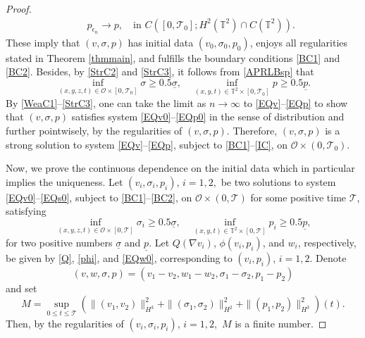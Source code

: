 \documentclass[12pt,reqno]{amsart}
\numberwithin{equation}{section}
\begin{document}
\begin{proof}
\begin{eqnarray}
    &&p_{\epsilon_n} \rightarrow p,\quad\mbox{in }C([0,\mathcal T_0]; H^2(\mathbb T^2)\cap C(\mathbb T^2)).\label{StrC3}
  \end{eqnarray}
  These imply that $(v,\sigma,p)$ has initial data $(v_0,\sigma_0,p_0)$, enjoys all regularities stated in Theorem \ref{thmmain}, and fulfills the boundary conditions \eqref{BC1} and \eqref{BC2}.
  Besides, by \eqref{StrC2} and \eqref{StrC3}, it follows from \eqref{APRLBsp} that
  \begin{equation*}
    \inf_{(x,y,z,t)\in\mathcal O\times[0,\mathcal T_0]}\sigma \geq0.5\underline\sigma,\quad \inf_{(x,y,t)\in\mathbb T^2\times[0,\mathcal T_0]}p \geq0.5\underline p.
  \end{equation*}
  By \eqref{WeaC1}--\eqref{StrC3}, one can take the limit as $n\rightarrow\infty$ to \eqref{EQv}--\eqref{EQp} to show that $(v,\sigma,p)$ satisfies system \eqref{EQv0}--\eqref{EQp0} in the sense of distribution and further  pointwisely, by the regularities of $(v,\sigma,p)$. Therefore, $(v,\sigma,p)$ is a strong solution
  to system \eqref{EQv}--\eqref{EQp}, subject to \eqref{BC1}--\eqref{IC}, on $\mathcal O\times(0,\mathcal T_0)$.

  Now, we prove the continuous dependence on the initial data which in particular implies the uniqueness. Let $(v_i, \sigma_i, p_i)$, $i=1,2,$
  be two solutions to system \eqref{EQv0}--\eqref{EQs0}, subject to \eqref{BC1}--\eqref{BC2}, on $\mathcal O\times(0,\mathcal T)$ for some positive time $\mathcal T$, satisfying
  \begin{equation}
    \inf_{(x,y,z,t)\in\mathcal O\times[0,\mathcal T]}\sigma_i\geq0.5\underline\sigma,\quad\inf_{(x,y,t)\in\mathbb T^2\times[0,\mathcal T]}p_i\geq 0.5\underline p,\label{LBspi}
  \end{equation}
  for two positive numbers $\underline\sigma$ and $\underline p$. Let $Q(\nabla v_i)$, $\phi(v_i, p_i)$, and $w_i$, respectively, be given by \eqref{Q}, \eqref{phi}, and \eqref{EQw0}, corresponding to $(v_i, p_i)$, $i=1,2$. Denote
  $$
  (v,w,\sigma,p)=(v_1-v_2, w_1-w_2, \sigma_1-\sigma_2, p_1-p_2)
  $$
  and set
  \begin{equation}
  \label{M}
  M=\sup_{0\leq t\leq\mathcal T}\left(\|(v_1, v_2)\|_{H^3}^2+\|(\sigma_1,\sigma_2)\|_{H^2}^2+\|(p_1,p_2)\|_{H^3}^2\right)(t).
  \end{equation}
  Then, by the regularities of $(v_i, \sigma_i, p_i)$, $i=1,2,$ $M$ is a finite number.


\end{proof}
\end{document}
